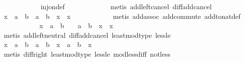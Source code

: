 \begin{isabellebody}
\ \ \ \ \ \ \ \ \ \ \isamarkupfalse%
\ inj{\isacharunderscore}{\kern0pt}on{\isacharunderscore}{\kern0pt}def\ \isanewline
\ \ \ \ \ \ \ \ \ \ \isamarkupfalse%
\ {\isacharparenleft}{\kern0pt}metis\ add{\isachardot}{\kern0pt}left{\isacharunderscore}{\kern0pt}cancel\ diff{\isacharunderscore}{\kern0pt}add{\isacharunderscore}{\kern0pt}cancel{\isacharparenright}{\kern0pt}\isanewline
\ \ \ \ \ \ \ \ \isamarkupfalse%
\ {\isachardoublequoteopen}x\ {\isacharplus}{\kern0pt}\ {\isacharparenleft}{\kern0pt}a\ {\isacharplus}{\kern0pt}\ b{\isacharparenright}{\kern0pt}\ {\isacharequal}{\kern0pt}\ a\ {\isacharplus}{\kern0pt}\ {\isacharparenleft}{\kern0pt}b\ {\isacharplus}{\kern0pt}\ x{\isacharparenright}{\kern0pt}{\isachardoublequoteclose}\ \ x\isanewline
\ \ \ \ \ \ \ \ \ \ \isamarkupfalse%
\ {\isacharparenleft}{\kern0pt}metis\ add{\isachardot}{\kern0pt}assoc\ add{\isachardot}{\kern0pt}commute\ add{\isacharunderscore}{\kern0pt}to{\isacharunderscore}{\kern0pt}nat{\isacharunderscore}{\kern0pt}def{\isacharparenright}{\kern0pt}\isanewline
\ \ \ \ \ \ \ \ \isamarkupfalse%
\ \isamarkupfalse%
\ {\isachardoublequoteopen}x\ {\isacharless}{\kern0pt}\ a\ {\isacharplus}{\kern0pt}\ b\ {\isasymLongrightarrow}\ {}\ {\isacharless}{\kern0pt}\ a\ {\isacharplus}{\kern0pt}\ b\ {\isacharminus}{\kern0pt}\ x{\isachardoublequoteclose}\ \ x\isanewline
\ \ \ \ \ \ \ \ \ \ \isamarkupfalse%
\ {\isacharparenleft}{\kern0pt}metis\ add{\isachardot}{\kern0pt}left{\isacharunderscore}{\kern0pt}neutral\ diff{\isacharunderscore}{\kern0pt}add{\isacharunderscore}{\kern0pt}cancel\ least{\isacharunderscore}{\kern0pt}mod{\isacharunderscore}{\kern0pt}type\ less{\isacharunderscore}{\kern0pt}le{\isacharparenright}{\kern0pt}\isanewline
\ \ \ \ \ \ \ \ \isamarkupfalse%
\ \isamarkupfalse%
\ {\isachardoublequoteopen}x\ {\isacharless}{\kern0pt}\ a\ {\isacharplus}{\kern0pt}\ b\ {\isasymLongrightarrow}\ a\ {\isacharplus}{\kern0pt}\ b\ {\isacharminus}{\kern0pt}\ x\ {\isasymle}\ a\ {\isacharplus}{\kern0pt}\ b{\isachardoublequoteclose}\ \ x\isanewline
\ \ \ \ \ \ \ \ \ \ \isamarkupfalse%
\ {\isacharparenleft}{\kern0pt}metis\ diff{\isacharunderscore}{\kern0pt}{}{\isacharunderscore}{\kern0pt}right\ least{\isacharunderscore}{\kern0pt}mod{\isacharunderscore}{\kern0pt}type\ less{\isacharunderscore}{\kern0pt}le\ mod{\isacharunderscore}{\kern0pt}less{\isacharunderscore}{\kern0pt}diff\ not{\isacharunderscore}{\kern0pt}less{\isacharparenright}{\kern0pt}\isanewline

\end{isabellebody}

